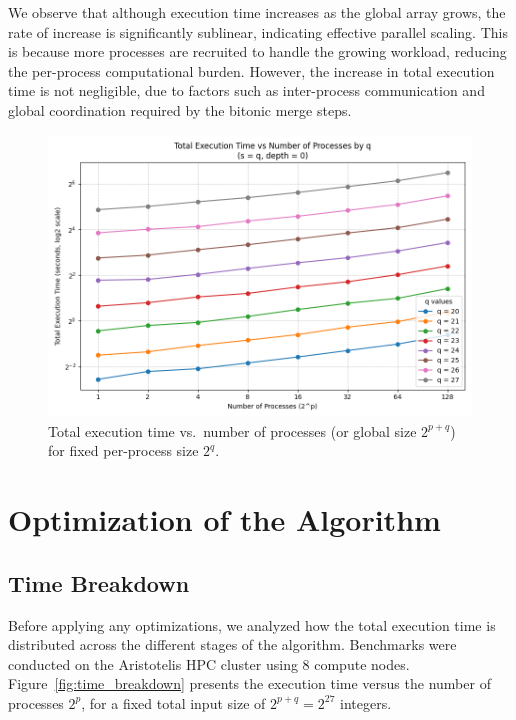 \documentclass{article}
\begin{document}
We observe that although execution time increases as the global array grows, the rate of increase is 
significantly sublinear, indicating effective parallel scaling. This is because more processes are 
recruited to handle the growing workload, reducing the per-process computational burden. However, 
the increase in total execution time is not negligible, due to factors such as inter-process communication 
and global coordination required by the bitonic merge steps.

\begin{figure}[h]
    \centering
    \includegraphics[width=1\linewidth]{figures/total_time_vs_procs_by_q.png}
    \caption{Total execution time vs.\ number of processes (or global size $2^{p+q}$) for fixed per-process 
    size $2^q$.}
    \label{fig:total_time_vs_procs_by_q}
\end{figure}


\section{Optimization of the Algorithm}

\subsection{Time Breakdown}

Before applying any optimizations, we analyzed how the total execution time is distributed across the 
different stages of the algorithm. Benchmarks were conducted on the Aristotelis HPC cluster using 8 
compute nodes. Figure~\ref{fig:time_breakdown} presents the execution time versus the number of processes 
$2^p$, for a fixed total input size of $2^{p+q} = 2^{27}$ integers.
\end{document}
